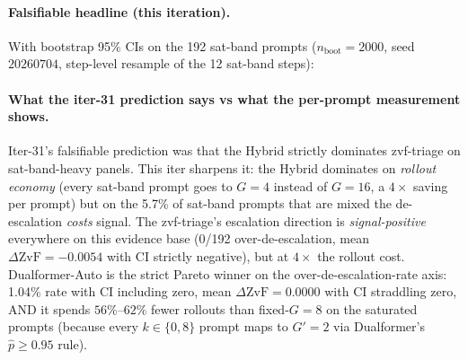 \paragraph{Falsifiable headline (this iteration).}
With bootstrap 95\% CIs on the 192 sat-band prompts
($n_\mathrm{boot}{=}2000$, seed~$20260704$, step-level resample of the
12 sat-band steps):

\begin{table}[t]
\centering
\caption{Per-controller over-de-escalation rate on the 192 sat-band
prompts (where ``over-de-escalation'' means $\mathrm{ZvF}_\mathrm{ctrl} > \mathrm{ZvF}_\text{baseline}$,
positive $\Delta =$ worse signal). Hybrid's rate is $5.73\%$ with CI
entirely above zero; zvf-triage's rate is $0.00\%$ (CI is degenerate at
zero because escalation never worsens signal on already-saturated
prompts); Dualformer-Auto's rate is $1.04\%$ with CI including zero.}
\label{tab:p7-satband-overdeesc}
\end{table}

\paragraph{What the iter-31 prediction says vs what the per-prompt
measurement shows.}
Iter-31's falsifiable prediction was that the Hybrid strictly
dominates zvf-triage on sat-band-heavy panels. This iter sharpens it:
the Hybrid dominates on \emph{rollout economy} (every sat-band prompt
goes to $G{=}4$ instead of $G{=}16$, a $4\times$ saving per prompt)
but on the 5.7\% of sat-band prompts that are mixed the de-escalation
\emph{costs} signal. The zvf-triage's escalation direction is
\emph{signal-positive} everywhere on this evidence base (0/192
over-de-escalation, mean $\Delta\mathrm{ZvF}=-0.0054$ with CI strictly
negative), but at $4\times$ the rollout cost. Dualformer-Auto is the
strict Pareto winner on the over-de-escalation-rate axis: 1.04\% rate
with CI including zero, mean $\Delta\mathrm{ZvF}=0.0000$ with CI
straddling zero, AND it spends $56\%$--$62\%$ fewer rollouts than
fixed-$G{=}8$ on the saturated prompts (because every $k \in \{0,8\}$
prompt maps to $G'=2$ via Dualformer's $\hat p \ge 0.95$ rule).

